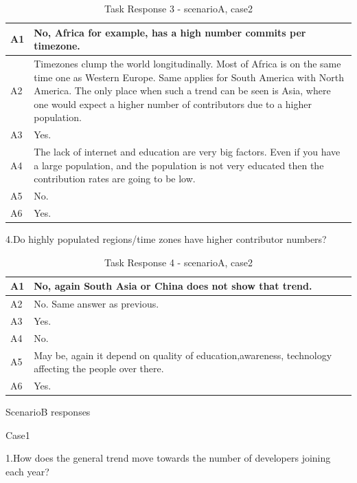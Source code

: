 \documentclass[seploa]{beavtex}
\begin{document}
\begin{appendices}
\begin{table}[H]
\begin{tabular}{ |p{2cm}|p{12cm}| }
 \hline
 A1 & No, Africa for example, has a high number commits per timezone.\\
 \hline
 A2 & Timezones clump the world longitudinally. Most of Africa is on the same time one as Western Europe. Same applies for South America with North America. The only place when such a trend can be seen is Asia, where one would expect a higher number of contributors due to a higher population.\\ \hline
 A3 & Yes.\\ \hline
 A4 & The lack of internet and education are very big factors. Even if you have a large population, and the population is not very educated then the contribution rates are going to be low.\\ \hline
 A5 & No.\\ \hline
 A6 & Yes.\\
 \hline
\end{tabular}
\caption{Task Response 3 - scenarioA, case2}
\label{tab:table13}
\end{table}

4.Do highly populated regions/time zones have higher contributor numbers?

\begin{table}[H]
\begin{tabular}{ |p{2cm}|p{12cm}| }
 \hline
 A1 & No, again South Asia or China does not show that trend.\\
 \hline
 A2 & No. Same answer as previous.\\ \hline
 A3 & Yes.\\ \hline
 A4 & No.\\ \hline
 A5 & May be, again it depend on quality of education,awareness, technology affecting the people over there.\\ \hline
 A6 & Yes.\\
 \hline
\end{tabular}
\caption{Task Response 4 - scenarioA, case2}
\label{tab:table14}
\end{table}

ScenarioB responses

Case1

1.How does the general trend move towards the number of developers joining each year?	


\end{appendices}
\end{document}

